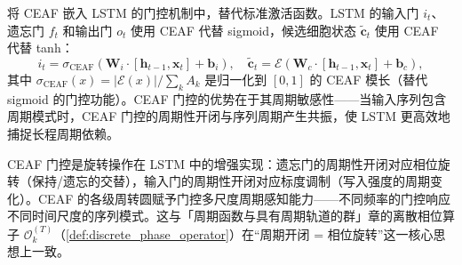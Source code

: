 \begin{definition}\label{def:eaf_lstm}
将 CEAF 嵌入 LSTM 的门控机制中，替代标准激活函数。LSTM 的输入门 $i_t$、遗忘门 $f_t$ 和输出门 $o_t$ 使用 CEAF 代替 sigmoid，候选细胞状态 $\tilde{\mathbf{c}}_t$ 使用 CEAF 代替 tanh：
\[
i_t = \sigma_{\text{CEAF}}(\mathbf{W}_i \cdot [\mathbf{h}_{t-1}, \mathbf{x}_t] + \mathbf{b}_i), \quad \tilde{\mathbf{c}}_t = \mathcal{E}(\mathbf{W}_c \cdot [\mathbf{h}_{t-1}, \mathbf{x}_t] + \mathbf{b}_c),
\]
其中 $\sigma_{\text{CEAF}}(x) = |\mathcal{E}(x)| / \sum_k A_k$ 是归一化到 $[0,1]$ 的 CEAF 模长（替代 sigmoid 的门控功能）。CEAF 门控的优势在于其周期敏感性——当输入序列包含周期模式时，CEAF 门控的周期性开闭与序列周期产生共振，使 LSTM 更高效地捕捉长程周期依赖。

CEAF 门控是旋转操作在 LSTM 中的增强实现：遗忘门的周期性开闭对应相位旋转（保持/遗忘的交替），输入门的周期性开闭对应标度调制（写入强度的周期变化）。CEAF 的各级周转圆赋予门控多尺度周期感知能力——不同频率的门控响应不同时间尺度的序列模式。这与「周期函数与具有周期轨道的群」章的离散相位算子 $\mathcal{O}_k^{(T)}$（\cref{def:discrete_phase_operator}）在“周期开闭 = 相位旋转”这一核心思想上一致。
\end{definition}

